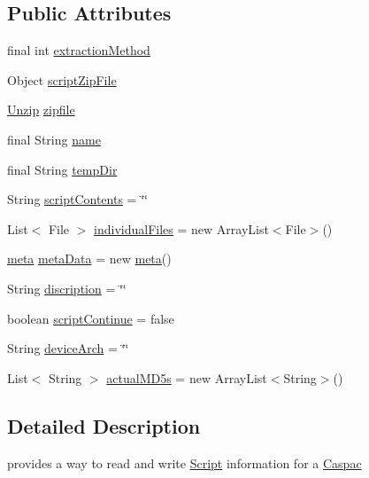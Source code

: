 \subsection*{Public Attributes}
\begin{DoxyCompactItemize}
\item 
final int \hyperlink{class_c_a_s_u_a_l_1_1caspac_1_1_script_ae040eb95ecb947f2c0263a3456205f98}{extraction\-Method}
\item 
Object \hyperlink{class_c_a_s_u_a_l_1_1caspac_1_1_script_a9e7e9a549d9e156aa74f0e574f7c03e1}{script\-Zip\-File}
\item 
\hyperlink{class_c_a_s_u_a_l_1_1archiving_1_1_unzip}{Unzip} \hyperlink{class_c_a_s_u_a_l_1_1caspac_1_1_script_a98e22d83bfc5c8d4dd4d7f2a62b433d3}{zipfile}
\item 
final String \hyperlink{class_c_a_s_u_a_l_1_1caspac_1_1_script_a3efcef19df03c62a6c70b08dc56630a7}{name}
\item 
final String \hyperlink{class_c_a_s_u_a_l_1_1caspac_1_1_script_add96e553bd0b9511f74ac7e41cba4536}{temp\-Dir}
\item 
String \hyperlink{class_c_a_s_u_a_l_1_1caspac_1_1_script_aea41000f3b6648674b00a913f92b3430}{script\-Contents} = \char`\"{}\char`\"{}
\item 
List$<$ File $>$ \hyperlink{class_c_a_s_u_a_l_1_1caspac_1_1_script_a207f2b32857121fe8146739c6ef59927}{individual\-Files} = new Array\-List$<$File$>$()
\item 
\hyperlink{class_c_a_s_u_a_l_1_1caspac_1_1_script_1_1meta}{meta} \hyperlink{class_c_a_s_u_a_l_1_1caspac_1_1_script_a5b58ff7a14e102e7014742deb3c69bf2}{meta\-Data} = new \hyperlink{class_c_a_s_u_a_l_1_1caspac_1_1_script_1_1meta}{meta}()
\item 
String \hyperlink{class_c_a_s_u_a_l_1_1caspac_1_1_script_af7d466f393929435e6a6ccecacc324de}{discription} = \char`\"{}\char`\"{}
\item 
boolean \hyperlink{class_c_a_s_u_a_l_1_1caspac_1_1_script_a53be0b1b8c3afd7cc520558edb8d999a}{script\-Continue} = false
\item 
String \hyperlink{class_c_a_s_u_a_l_1_1caspac_1_1_script_ad279923c361a980ee47bf805e546e6b3}{device\-Arch} = \char`\"{}\char`\"{}
\item 
List$<$ String $>$ \hyperlink{class_c_a_s_u_a_l_1_1caspac_1_1_script_a2cb67bdbfa6bb794cd55bdbf0208b69f}{actual\-M\-D5s} = new Array\-List$<$String$>$()
\end{DoxyCompactItemize}


\subsection{Detailed Description}
provides a way to read and write \hyperlink{class_c_a_s_u_a_l_1_1caspac_1_1_script}{Script} information for a \hyperlink{class_c_a_s_u_a_l_1_1caspac_1_1_caspac}{Caspac}

